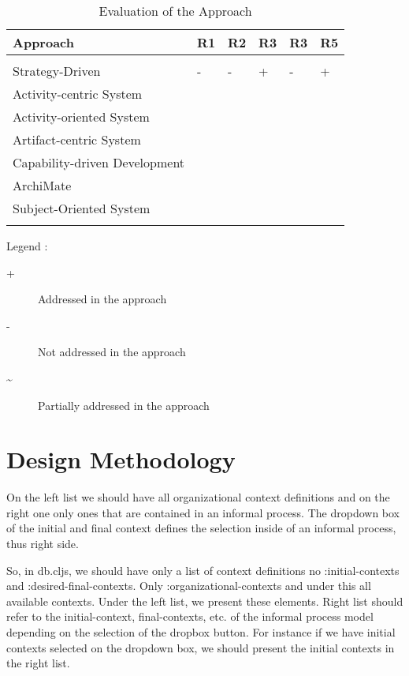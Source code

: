 \begin{center}
	\begin{longtable}{p{5cm}p{2cm}p{2cm}p{2cm}p{2cm}p{2cm}} 
		\toprule 
		\textbf{Approach} & \textbf{R1}  & \textbf{R2}  & \textbf{R3}  & \textbf{R3}  & \textbf{R5} \\
		\midrule
		\endfirsthead
		\\
	   	Strategy-Driven & -  & -  & +  & -  & + \\
	   	Activity-centric System  \\
	   	Activity-oriented System  \\
	   	Artifact-centric System  \\
	   	Capability-driven Development \\
	   	ArchiMate \\
	    Subject-Oriented System \\
		
		\bottomrule
		\caption{Evaluation of the Approach}
		\label{tab:evaluationoftheapproach}
	\end{longtable}	
\end{center}

Legend :
\begin{description}
	\item[+]  Addressed in the approach
	\item[-]  Not addressed in the approach
	\item[\~] Partially addressed in the approach
\end{description}

\section{Design Methodology}
\label{sec:designmethodology}

On the left list we should have all organizational context definitions and on the right one only ones that are contained in an informal process. The dropdown box of the initial and final context defines the selection inside of an informal process, thus right side.

So, in db.cljs, we should have only a list of context definitions no :initial-contexts and :desired-final-contexts. Only :organizational-contexts and under this all available contexts. Under the left list, we present these elements. Right list should refer to the initial-context, final-contexts, etc. of the informal process model depending on the selection of the dropbox button. For instance if we have initial contexts selected on the dropdown box, we should present the initial contexts in the right list.

